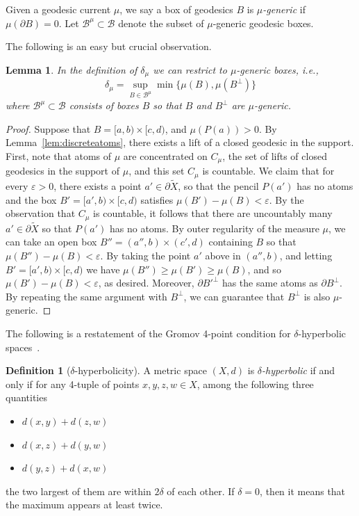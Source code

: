 \documentclass[12pt,article]{amsart}
\numberwithin{equation}{section}
\numberwithin{figure}{section}
\newtheorem{lemma}[equation]{Lemma}
\theoremstyle{definition}
\newtheorem{definition}[equation]{Definition}
\theoremstyle{plain}
\newcommand\B{\ensuremath{\mathcal{B}}}
\newcommand*{\Bg}[1]{\ensuremath{\mathcal{B}^{#1}}}
\newcommand*{\wt}[1]{\widetilde{#1}}
\renewcommand{\epsilon}{\varepsilon}
\begin{document}
Given a geodesic current $\mu$, we say a box of geodesics $B$ is \emph{$\mu$-generic} if $\mu(\partial B)=0$. Let $\mathcal{B}^{\mu} \subset \mathcal{B}$ denote the subset of $\mu$-generic geodesic boxes.

The following is an easy but crucial observation.

\begin{lemma} 
In the definition of $\delta_{\mu}$ we can restrict to $\mu$-generic boxes, i.e.,
\[
\delta_{\mu} =\sup_{B  \in \Bg{\mu} }\min \{ \mu(B) , \mu(B^{\perp}) \}
\]
where $\Bg{\mu} \subset \B$ consists of boxes $B$ so that $B$ and $B^{\perp}$ are $\mu$-generic.
\label{lem:deltageneric}
\end{lemma}
\begin{proof}
Suppose that $B=[a,b) \times [c,d)$, and $\mu(P(a))>0$. By Lemma~\ref{lem:discreteatoms}, there exists a lift of a closed geodesic in the support.
First, note that atoms of $\mu$ are concentrated on $C_{\mu}$, the set of lifts of closed geodesics in the support of $\mu$, and this set $C_{\mu}$ is countable. We claim that for every $\epsilon> 0$, there exists a point $a' \in \partial \wt{X}$, so that the pencil $P(a')$ has no atoms and the box $B'=[a',b) \times [c,d)$ satisfies $\mu(B')-\mu(B)<\epsilon$. By the observation that $C_{\mu}$ is countable, it follows that there are uncountably many $a' \in \partial \wt{X}$ so that $P(a')$ has no atoms. By outer regularity of the measure $\mu$, we can take an open box $B''=(a'',b) \times (c',d)$ containing $B$ so that $\mu(B'')-\mu(B)<\epsilon$. By taking the point $a'$ above in $(a'',b)$, and letting $B'=[a',b) \times [c,d)$ we have $\mu(B'')\geq \mu(B') \geq \mu(B)$, and so $\mu(B') - \mu(B)<\epsilon$, as desired.
Moreover, $\partial B'^{\perp}$ has the same atoms as $\partial B^{\perp}$. By repeating the same argument with $B^{\perp}$, we can guarantee that $B^{\perp}$ is also $\mu$-generic.
\end{proof}

The following is a restatement of the Gromov 4-point condition for $\delta$-hyperbolic spaces~\cite[Page~410]{BH11:NonPosCurvature}.

\begin{definition}[$\delta$-hyperbolicity]
A metric space $(X,d)$ is \emph{$\delta$-hyperbolic} if and only if for any 4-tuple of points $x,y,z,w \in X$, among the following three quantities
\begin{itemize}
    \item $d(x,y) + d(z,w)$
    \item $d(x,z) + d(y,w)$
    \item $d(y,z) + d(x,w)$
\end{itemize}
the two largest of them are within $2\delta$ of each other. If $\delta=0$, then it means that the maximum appears at least twice.
\label{lem:hyperbolic}
\end{definition}
\end{document}
